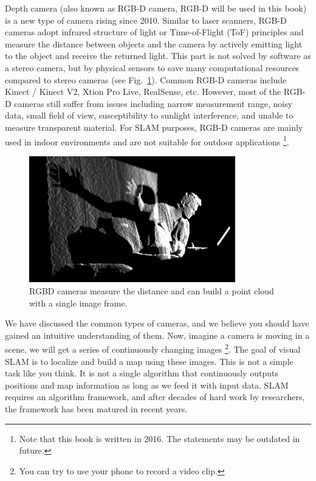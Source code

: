 Depth camera (also known as RGB-D camera, RGB-D will be used in this book) is a new type of camera rising since 2010. Similar to laser scanners, RGB-D cameras adopt infrared structure of light or Time-of-Flight (ToF) principles and measure the distance between objects and the camera by actively emitting light to the object and receive the returned light. This part is not solved by software as a stereo camera, but by physical sensors to save many computational resources compared to stereo cameras (see Fig.~\ref{fig:RGBD}). Common RGB-D cameras include Kinect / Kinect V2, Xtion Pro Live, RealSense, etc. However, most of the RGB-D cameras still suffer from issues including narrow measurement range, noisy data, small field of view, susceptibility to sunlight interference, and unable to measure transparent material. For SLAM purposes, RGB-D cameras are mainly used in indoor environments and are not suitable for outdoor applications \footnote{Note that this book is written in 2016. The statements may be outdated in future.}.

\begin{figure}
    \centering
    \includegraphics[width=0.8\textwidth]{./resources/whatIsSLAM/rgbd.pdf}
    \caption{RGBD cameras measure the distance and can build a point cloud with a single image frame.}
    \label{fig:RGBD}
\end{figure}

We have discussed the common types of cameras, and we believe you should have gained an intuitive understanding of them. Now, imagine a camera is moving in a scene, we will get a series of continuously changing images \footnote{You can try to use your phone to record a video clip.}. The goal of visual SLAM is to localize and build a map using these images. This is not a simple task like you think. It is not a single algorithm that continuously outputs positions and map information as long as we feed it with input data. SLAM requires an algorithm framework, and after decades of hard work by researchers, the framework has been matured in recent years.

